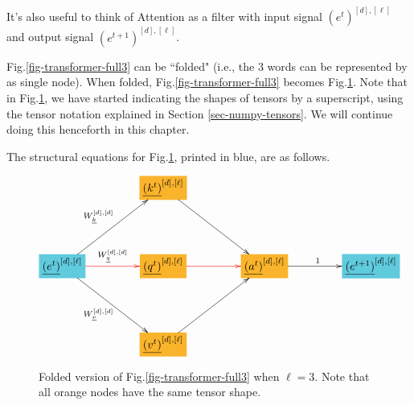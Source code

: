 It's also useful to think of Attention
as a filter with input signal $(e^t)^{[d], [\ell]}$ and output signal
$(e^{t+1})^{[d], [\ell]}$.

Fig.\ref{fig-transformer-full3} can
be ``folded" (i.e., the 3 words can be
represented by as single node).
When folded, Fig.\ref{fig-transformer-full3}
becomes Fig.\ref{fig-transformer-recurrent-folded-1head}. Note that in Fig.\ref{fig-transformer-recurrent-folded-1head}, we have started indicating the
shapes of tensors by a superscript,
using the tensor notation
explained in Section \ref{sec-numpy-tensors}. We will continue doing this henceforth in this chapter.

The structural equations for
Fig.\ref{fig-transformer-recurrent-folded-1head}, printed in blue,
are as follows.




\begin{figure}[!h]\centering
$$\xymatrix@R=4pc@C=4pc{
&*+[F*:Dandelion]{\underline{(k^t)}^{[d],[\ell]}}\ar[dr]&&
\\
*+[F*:SkyBlue]{\underline{(e^t)}^{[d],[\ell]}}\ar[ur]^{W_\rvk^{[d], [d]}}\ar@[red][r]^{W_\rvq^{[d], [d]}}\ar[dr]_{W_\rvv^{[d], [d]}}&*+[F*:Dandelion]{\underline{(q^t)}^{[d],[\ell]}}\ar@[red][r]&*+[F*:Dandelion]{\underline{(a^t)}^{[d],[\ell]}}\ar[r]^{1}&*+[F*:SkyBlue]{\underline{(e^{t+1})}^{[d],[\ell]}}
\\
&*+[F*:Dandelion]{\underline{(v^t)}^{[d],[\ell]}}\ar[ur]&&
}$$
\caption{Folded version of
Fig.\ref{fig-transformer-full3} when $\ell=3$. Note that all orange nodes
have the same tensor shape.}
\label{fig-transformer-recurrent-folded-1head}
\end{figure}

